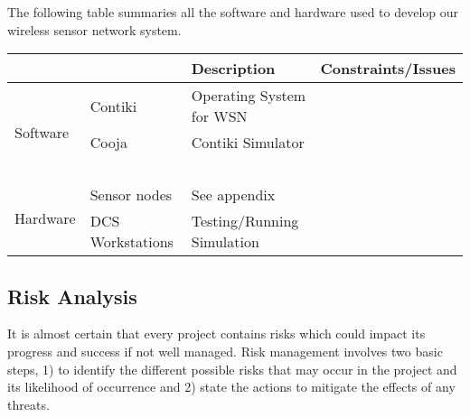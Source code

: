 The following table summaries all the software and hardware used to develop our wireless sensor network system. 



\begin{table}[H]
\begin{tabular}{| l | l | p{6cm} | p{3.5cm} |}
	\hline
	~ & ~ & Description & Constraints/Issues\\
	\hline

	\multirow{3}{*}{Software} & Contiki & Operating System for WSN & ~\\ 
	
	\cline{2-4}

	& Cooja & Contiki Simulator & ~\\ 
	
	\cline{2-4}
	
	& ~ & ~ & ~ \\ \hline

	\multirow{2}{*}{Hardware} & Sensor nodes & See appendix & ~\\ 
	
	\cline{2-4}

	& DCS Workstations & Testing/Running Simulation & ~\\ 
	
	\hline

\end{tabular}
\end{table}


\subsection{Risk Analysis}
It is almost certain that every project contains risks which could impact its progress and success if not well managed. Risk management involves two basic steps, 1) to identify the different possible risks that may occur in the project and its likelihood of occurrence and 2) state the actions to mitigate the effects of any threats.

